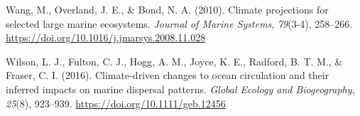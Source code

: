 \documentclass[
  12pt,
]{article}
\newlength{\cslhangindent}
\newenvironment{CSLReferences}[2] %
 {\begin{list}{}{%
  \setlength{\itemindent}{0pt}
  \setlength{\leftmargin}{0pt}
  \setlength{\parsep}{0pt}
  \ifodd #1
   \setlength{\leftmargin}{\cslhangindent}
   \setlength{\itemindent}{-1\cslhangindent}
  \fi
  \setlength{\itemsep}{#2\baselineskip}}}
 {\end{list}}
\begin{document}
\begin{CSLReferences}{1}{2}
Wang, M., Overland, J. E., \& Bond, N. A. (2010). Climate projections for selected large marine ecosystems. \emph{Journal of Marine Systems}, \emph{79}(3-4), 258--266. \url{https://doi.org/10.1016/j.jmarsys.2008.11.028}

Wilson, L. J., Fulton, C. J., Hogg, A. M., Joyce, K. E., Radford, B. T. M., \& Fraser, C. I. (2016). Climate{-}driven changes to ocean circulation and their inferred impacts on marine dispersal patterns. \emph{Global Ecology and Biogeography}, \emph{25}(8), 923--939. \url{https://doi.org/10.1111/geb.12456}

\end{CSLReferences}
\end{document}
